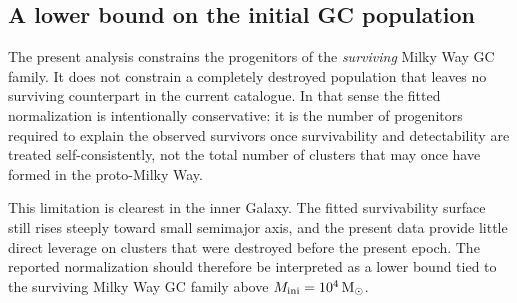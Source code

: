 \documentclass[fleqn,usenatbib]{mnras}
\begin{document}
\clearpage

\subsection{A lower bound on the initial GC population}\label{sec:lower_bound}
The present analysis constrains the progenitors of the \emph{surviving} Milky Way GC family. It does not constrain a completely destroyed population that leaves no surviving counterpart in the current catalogue. In that sense the fitted normalization is intentionally conservative: it is the number of progenitors required to explain the observed survivors once survivability and detectability are treated self-consistently, not the total number of clusters that may once have formed in the proto-Milky Way.

This limitation is clearest in the inner Galaxy. The fitted survivability surface still rises steeply toward small semimajor axis, and the present data provide little direct leverage on clusters that were destroyed before the present epoch. The reported normalization should therefore be interpreted as a lower bound tied to the surviving Milky Way GC family above $M_{\rm ini}=10^4\,{\rm M}_\odot$.
\end{document}
